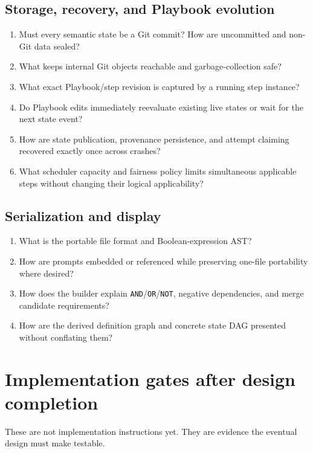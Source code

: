 \documentclass[11pt]{article}
\begin{document}
\subsection{Storage, recovery, and Playbook evolution}

\begin{enumerate}
  \item Must every semantic state be a Git commit? How are uncommitted and non-Git data sealed?
  \item What keeps internal Git objects reachable and garbage-collection safe?
  \item What exact Playbook/step revision is captured by a running step instance?
  \item Do Playbook edits immediately reevaluate existing live states or wait for the next state event?
  \item How are state publication, provenance persistence, and attempt claiming recovered exactly once across crashes?
  \item What scheduler capacity and fairness policy limits simultaneous applicable steps without changing their logical applicability?
\end{enumerate}

\subsection{Serialization and display}

\begin{enumerate}
  \item What is the portable file format and Boolean-expression AST?
  \item How are prompts embedded or referenced while preserving one-file portability where desired?
  \item How does the builder explain \texttt{AND}/\texttt{OR}/\texttt{NOT}, negative dependencies, and merge candidate requirements?
  \item How are the derived definition graph and concrete state DAG presented without conflating them?
\end{enumerate}

\section{Implementation gates after design completion}

These are not implementation instructions yet. They are evidence the eventual design must make testable.
\end{document}

